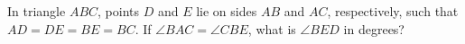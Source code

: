 In triangle $ABC$, points $D$ and $E$ lie on sides $AB$ and $AC$, respectively, such that $AD = DE = BE = BC$. If $\angle BAC = \angle CBE$, what is $\angle BED$ in degrees?
